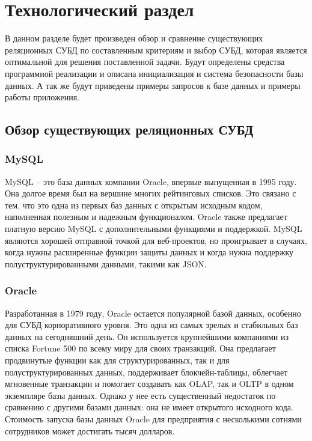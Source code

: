 \chapter{Технологический раздел}

В данном разделе будет произведен обзор и сравнение существующих реляционных СУБД по составленным критериям и выбор СУБД, которая является оптимальной для решения поставленной задачи. Будут определены средства программной реализации и описана инициализация и система безопасности базы данных. А так же будут приведены примеры запросов к базе данных и примеры работы приложения.

\section{Обзор существующих реляционных СУБД}

\subsection{MySQL}  

MySQL\cite{mysql} -- это база данных компании Oracle, впервые выпущенная в 1995 году. Она долгое время был на вершине многих рейтинговых списков. Это связано с тем, что это одна из первых баз данных с открытым исходным кодом, наполненная полезным и надежным функционалом. Oracle также предлагает платную версию MySQL с дополнительными функциями и поддержкой. MySQL являются хорошей отправной точкой для веб-проектов, но проигрывает в случаях, когда нужны расширенные функции защиты данных и когда нужна поддержку полуструктурированными данными, такими как JSON.

\subsection{Oracle}

Разработанная в 1979 году, Oracle\cite{oracledb} остается популярной базой данных, особенно для СУБД корпоративного уровня. Это одна из самых зрелых и стабильных баз данных на сегодняшний день. Он используется крупнейшими компаниями из списка Fortune 500 по всему миру для своих транзакций. Она предлагает продвинутые функции как для структурированных, так и для полуструктурированных данных, поддерживает блокчейн-таблицы, облегчает мгновенные транзакции и помогает создавать как OLAP, так и OLTP в одном экземпляре базы данных. Однако у нее есть существенный недостаток по сравнению с другими базами данных: она не имеет открытого исходного кода. Стоимость запуска базы данных Oracle для предприятия с несколькими сотнями сотрудников может достигать тысяч долларов.

